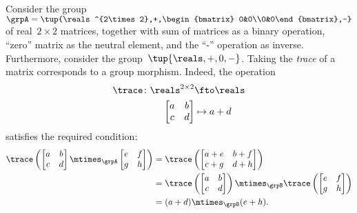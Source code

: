 \begin{example}
  Consider the group~$\grpA=\tup{\reals^{2\times 2},+,\begin{bmatrix} 0&0\\0&0\end{bmatrix},-}$ of real~$2\times 2$ matrices, together with sum of matrices as a binary operation, ``zero'' matrix as the neutral element, and the ``-'' operation as inverse.
  Furthermore, consider the group~$\tup{\reals,+,0,-}$. Taking the \emph{trace} of a matrix corresponds to a group morphism. Indeed, the operation
  \begin{equation*}
    \begin{aligned}
   \trace\colon \reals^{2\times 2}&\fto \reals\\
    \begin{bmatrix}
      a&b\\
      c&d
  \end{bmatrix}&\mapsto a+d
  \end{aligned}
  \end{equation*}
  satisfies the required condition:
  \begin{equation*}
    \begin{aligned}
      \trace \left(\begin{bmatrix}
      a&b\\
      c&d
  \end{bmatrix} \mtimes_\grpA \begin{bmatrix}
      e&f\\
      g&h
  \end{bmatrix} \right)&=\trace \left( \begin{bmatrix}
      a+e&b+f\\
      c+g&d+h
  \end{bmatrix}\right)\\
      &=\trace \left( \begin{bmatrix}
      a&b\\
      c&d
  \end{bmatrix}\right)\mtimes_\grpB \trace \left( \begin{bmatrix}
      e&f\\
      g&h
  \end{bmatrix}\right)\\
      &=(a+d)\mtimes_\grpB (e+h).
    \end{aligned}
  \end{equation*}
\end{example}
